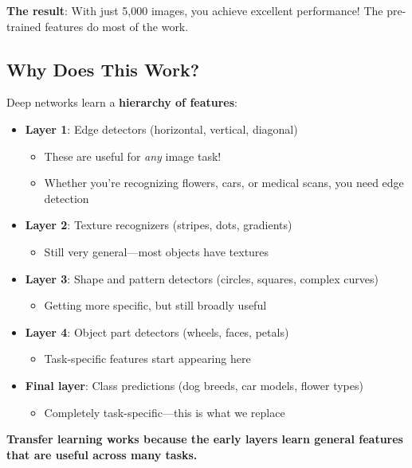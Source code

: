 \documentclass{article}
\begin{document}
\textbf{The result}: With just 5,000 images, you achieve excellent performance! The pre-trained features do most of the work.

\subsection{Why Does This Work?}

\begin{tcolorbox}[colback=green!5!white, colframe=green!50!black, title=The Hierarchy of Visual Features]
Deep networks learn a \textbf{hierarchy of features}:

\begin{itemize}
\item \textbf{Layer 1}: Edge detectors (horizontal, vertical, diagonal)
\begin{itemize}
\item These are useful for \textit{any} image task!
\item Whether you're recognizing flowers, cars, or medical scans, you need edge detection
\end{itemize}

\item \textbf{Layer 2}: Texture recognizers (stripes, dots, gradients)
\begin{itemize}
\item Still very general---most objects have textures
\end{itemize}

\item \textbf{Layer 3}: Shape and pattern detectors (circles, squares, complex curves)
\begin{itemize}
\item Getting more specific, but still broadly useful
\end{itemize}

\item \textbf{Layer 4}: Object part detectors (wheels, faces, petals)
\begin{itemize}
\item Task-specific features start appearing here
\end{itemize}

\item \textbf{Final layer}: Class predictions (dog breeds, car models, flower types)
\begin{itemize}
\item Completely task-specific---this is what we replace
\end{itemize}
\end{itemize}

\textbf{Transfer learning works because the early layers learn general features that are useful across many tasks.}
\end{tcolorbox}
\end{document}

